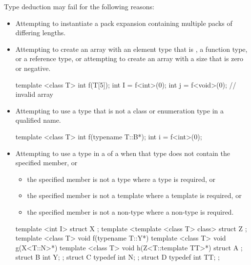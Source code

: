 \pnum
\begin{note}
Type deduction may fail for the following reasons:
\begin{itemize}
\item Attempting to instantiate a pack expansion containing multiple packs of differing lengths.
\item
Attempting to create an array with an element type that is , a
function type, or a reference type, or attempting
to create an array with a size that is zero or negative.
\begin{example}
\begin{codeblock}
template <class T> int f(T[5]);
int I = f<int>(0);
int j = f<void>(0);             // invalid array
\end{codeblock}
\end{example}
\item
Attempting to use a type that is not a class or enumeration type in a qualified name.
\begin{example}
\begin{codeblock}
template <class T> int f(typename T::B*);
int i = f<int>(0);
\end{codeblock}
\end{example}
\item
Attempting to use a type in a  of a
 when
that type does not contain the specified member, or
\begin{itemize}
\item
the specified member is not a type where a type is required, or
\item
the specified member is not a template where a template is required, or
\item
the specified member is not a non-type where a non-type is required.
\end{itemize}
\begin{example}
\begin{codeblock}
template <int I> struct X { };
template <template <class T> class> struct Z { };
template <class T> void f(typename T::Y*){}
template <class T> void g(X<T::N>*){}
template <class T> void h(Z<T::template TT>*){}
struct A {};
struct B { int Y; };
struct C {
  typedef int N;
};
struct D {
  typedef int TT;
};


\end{codeblock}
\end{example}
\end{itemize}
\end{note}
